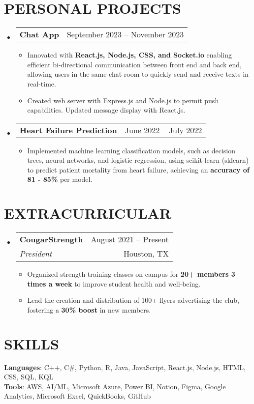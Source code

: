 \documentclass[letterpaper,10pt]{article}
\makeatletter
\newcommand{\resumeItem}[1]{
  \item\small{
    {#1 \vspace{-1pt}}
  }
}
\newcommand{\resumeSubheading}[4]{
  \vspace{-1pt}\item
    \begin{tabular*}{\textwidth}[t]{l@{\extracolsep{\fill}}r}
      \textbf{#1} & {\color{dark-grey}\small #2}\vspace{1pt}\\ %
      \textit{\small #3} & {\color{dark-grey} \small #4}\\ %
    \end{tabular*}\vspace{-4pt}
}
\newcommand{\resumeProjectHeading}[2]{
    \item
    \begin{tabular*}{\textwidth}{l@{\extracolsep{\fill}}r}
      #1 & {\color{dark-grey}\small #2} \\
    \end{tabular*}\vspace{-4pt}
}
\newcommand{\resumeSubHeadingListStart}{\begin{itemize}[leftmargin=0in, label={}]}
\newcommand{\resumeSubHeadingListEnd}{\end{itemize}}
\newcommand{\resumeItemListStart}{\begin{itemize}}
\newcommand{\resumeItemListEnd}{\end{itemize}\vspace{0pt}}
\makeatother
\begin{document}
\section{PERSONAL PROJECTS}
    \resumeSubHeadingListStart 
    \resumeProjectHeading
        {\textbf{Chat App}}{September 2023 -- November 2023}
        \resumeItemListStart
            \resumeItem{Innovated with \textbf{React.js, Node.js, CSS, and Socket.io} enabling efficient bi-directional communication between front end and back end, allowing users in the same chat room to quickly send and receive texts in real-time.}
            \resumeItem{Created web server with Express.js and Node.js to permit push capabilities. Updated message display with React.js.}
        \resumeItemListEnd        

    \resumeProjectHeading
        {\textbf{Heart Failure Prediction}}{June 2022 -- July 2022}
        \resumeItemListStart
            \resumeItem{Implemented machine learning classification models, such as decision trees, neural networks, and logistic regression, using scikit-learn (sklearn) to predict patient mortality from heart failure, achieving an \textbf{accuracy of 81 - 85\%} per model.}
        \resumeItemListEnd
    \resumeSubHeadingListEnd

\section{EXTRACURRICULAR}
  \resumeSubHeadingListStart
    \resumeSubheading
      {CougarStrength}{August 2021 -- Present}
      {President}{Houston, TX}
      \resumeItemListStart      
        \resumeItem{Organized strength training classes on campus for \textbf{20+ members 3 times a week} to improve student health and well-being.}
        \resumeItem{Lead the creation and distribution of 100+ flyers advertising the club, fostering a \textbf{30\% boost} in new members.}
      \resumeItemListEnd
  \resumeSubHeadingListEnd
  
%
\section{SKILLS}
 \begin{itemize}[leftmargin=0in, label={}]
    \small{\item{
     \textbf{Languages}: {C++, C\#, Python, R, Java, JavaScript, React.js, Node.js, HTML, CSS, SQL, KQL}\vspace{2pt} \\
     \textbf{Tools}:     {AWS, AI/ML, Microsoft Azure, Power BI, Notion, Figma, Google Analytics, Microsoft Excel, QuickBooks, GitHub}
    }}
 \end{itemize}


\end{document}
